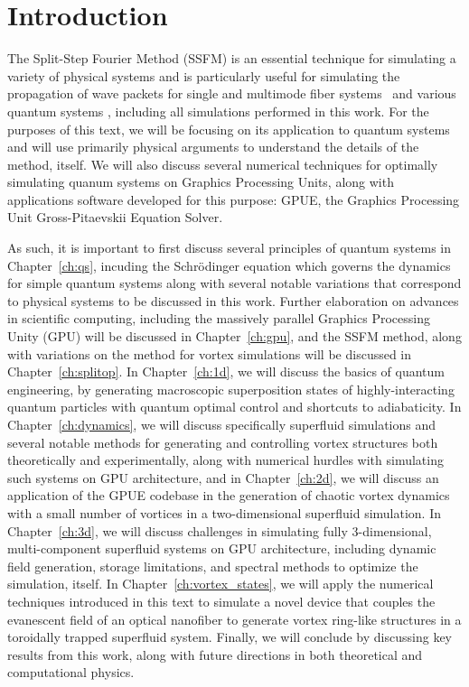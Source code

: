 \section*{Introduction}
The Split-Step Fourier Method (SSFM) is an essential technique for simulating a variety of physical systems and is particularly useful for simulating the propagation of wave packets for single and multimode fiber systems~\cite{agrawal2000} and various quantum systems , including all simulations performed in this work.
For the purposes of this text, we will be focusing on its application to quantum systems and will use primarily physical arguments to understand the details of the method, itself.
We will also discuss several numerical techniques for optimally simulating quanum systems on Graphics Processing Units, along with applications software developed for this purpose: GPUE, the Graphics Processing Unit Gross-Pitaevskii Equation Solver.

As such, it is important to first discuss several principles of quantum systems in Chapter~\ref{ch:qs}, incuding the Schr\"odinger equation which governs the dynamics for simple quantum systems along with several notable variations that correspond to physical systems to be discussed in this work.
Further elaboration on advances in scientific computing, including the massively parallel Graphics Processing Unity (GPU) will be discussed in Chapter~\ref{ch:gpu}, and the SSFM method, along with variations on the method for vortex simulations will be discussed in Chapter~\ref{ch:splitop}.
In Chapter~\ref{ch:1d}, we will discuss the basics of quantum engineering, by generating macroscopic superposition states of highly-interacting quantum particles with quantum optimal control and shortcuts to adiabaticity.
In Chapter~\ref{ch:dynamics}, we will discuss specifically superfluid simulations and several notable methods for generating and controlling vortex structures both theoretically and experimentally, along with numerical hurdles with simulating such systems on GPU architecture, and in Chapter~\ref{ch:2d}, we will discuss an application of the GPUE codebase in the generation of chaotic vortex dynamics with a small number of vortices in a two-dimensional superfluid simulation.
In Chapter~\ref{ch:3d}, we will discuss challenges in simulating fully 3-dimensional, multi-component superfluid systems on GPU architecture, including dynamic field generation, storage limitations, and spectral methods to optimize the simulation, itself.
In Chapter~\ref{ch:vortex_states}, we will apply the numerical techniques introduced in this text to simulate a novel device that couples the evanescent field of an optical nanofiber to generate vortex ring-like structures in a toroidally trapped superfluid system.
Finally, we will conclude by discussing key results from this work, along with future directions in both theoretical and computational physics.
